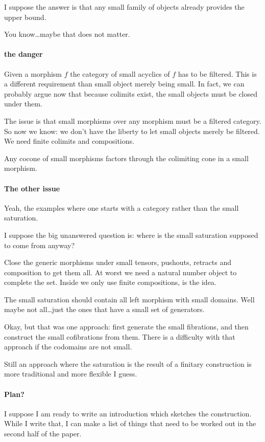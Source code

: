 \documentclass[csh.tex]{subfiles}
\begin{document}
I suppose the answer is that any small family of objects already provides the upper bound.

You know\dots maybe that does not matter.
\paragraph{the danger}
Given a morphism $f$ the category of small acyclics of $f$ has to be filtered. This is a different requirement than small object merely being small. In fact, we can probably argue now that because colimits exist, the small objects must be closed under them.

The issue is that small morphisms over any morphism must be a filtered category. So now we know: we don't have the liberty to let small objects merely be filtered. We need finite colimits and compositions.

Any cocone of small morphisms factors through the colimiting cone in a small morphism.

\paragraph{The other issue}
Yeah, the examples where one starts with a category rather than the small saturation.

I suppose the big unanswered question is: where is the small saturation supposed to come from anyway?

Close the generic morphisms under small tensors, pushouts, retracts and composition to get them all. At worst we need a natural number object to complete the set. Inside we only use finite compositions, is the idea.

The small saturation should contain all left morphism with small domains. Well maybe not all\dots just the ones that have a small set of generators.

Okay, but that was one approach: first generate the small fibrations, and then construct the small cofibrations from them. There is a difficulty with that approach if the codomains are not small.

Still an approach where the saturation is the result of a finitary construction is more traditional and more flexible I guess.

\paragraph{Plan?}
I suppose I am ready to write an introduction which sketches the construction. While I write that, I can make a list of things that need to be worked out in the second half of the paper.
\end{document}
